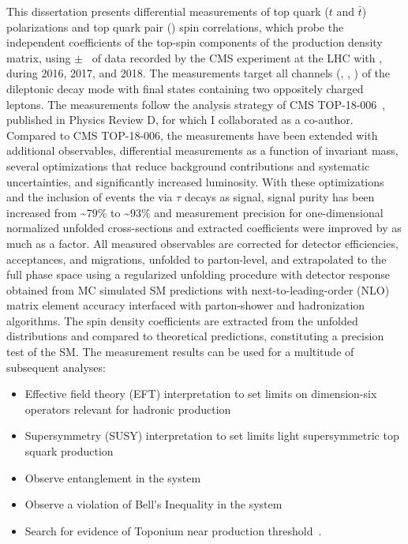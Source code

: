 \begin{refsection}
This dissertation presents differential measurements of top quark ($t$ and $\bar{t}$) polarizations and top quark pair (\ttbar) spin correlations, which probe the independent coefficients of the top-spin components of the \ttbar production density matrix, using \lumivalueRuniiUL $\pm$ \lumierrRuniiUL\ of data recorded by the CMS experiment at the LHC with \beamenergy, during 2016, 2017, and 2018.
The measurements target all channels (\ee, \emu, \mumu) of the \ttbar dileptonic decay mode with final states containing two oppositely charged leptons.
The measurements follow the analysis strategy of CMS TOP-18-006~\cite{Sirunyan:2681777}, published in Physics Review D, for which I collaborated as a co-author.
Compared to CMS TOP-18-006, the measurements have been extended with additional observables, differential measurements as a function of \ttbar invariant mass, several optimizations that reduce background contributions and systematic uncertainties, and significantly increased luminosity.
With these optimizations and the inclusion of \ttbar events the via $\tau$ decays as signal, signal purity has been increased from \sim$79\%$ to \sim$93\%$ and measurement precision for one-dimensional normalized unfolded cross-sections and extracted coefficients were improved by as much as a factor.
All measured observables are corrected for detector efficiencies, acceptances, and migrations, unfolded to parton-level, and extrapolated to the full phase space using a regularized unfolding procedure with detector response obtained from MC simulated SM predictions with next-to-leading-order (NLO) matrix element accuracy interfaced with parton-shower and hadronization algorithms.
The spin density coefficients are extracted from the unfolded distributions and compared to theoretical predictions, constituting a precision test of the SM.
The measurement results can be used for a multitude of subsequent analyses:
\begin{itemize}
    \item Effective field theory (EFT) interpretation to set limits on dimension-six operators relevant for hadronic \ttbar production~\cite{Sirunyan:2681777}
    \item Supersymmetry (SUSY) interpretation to set limits light supersymmetric top squark production~\cite{CMS-PAS-FTR-18-034}
    \item Observe entanglement in the \ttbar system~\cite{Afik_2021}
    \item Observe a violation of Bell's Inequality in the \ttbar system~\cite{Aguilar_Saavedra_2022}
    \item Search for evidence of Toponium near \ttbar production threshold~\cite{PhysRevD.104.034023}.
\end{itemize}


\end{refsection}
